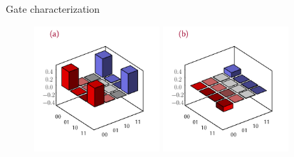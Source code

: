 \documentclass[final]{beamer}
\newlength{\colwidth}
\begin{document}
\begin{frame}[t]
\begin{columns}[t]
\begin{column}{\colwidth}
\begin{block}{Gate characterization}
                    \begin{figure}[htpb]
                        \begin{minipage}{11pc}
                            \includegraphics[width=11pc]{mat3d_toff_real.png}
                        \end{minipage}%
                        \begin{minipage}{11pc}
                            \includegraphics[width=11pc]{mat3d_toff_imaginary.png}

\end{minipage}
\end{figure}
\end{block}
\end{column}
\end{columns}
\end{frame}
\end{document}
